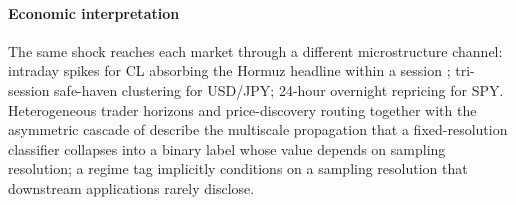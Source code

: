 \documentclass[preprint,12pt,authoryear]{elsarticle}
\begin{document}
\paragraph{Economic interpretation}
The same shock reaches each market through a different microstructure channel: intraday spikes for CL absorbing the Hormuz headline within a session \citep{ReutersIranMarkets2026Feb28}; tri-session safe-haven clustering for USD/JPY; 24-hour overnight repricing for SPY. Heterogeneous trader horizons \citep{MullerDacorognaDave1997HARCH} and price-discovery routing \citep{HasbrouckOneSecurity1995} together with the asymmetric cascade of \citet{GradojevicTsiakas2021} describe the multiscale propagation that a fixed-resolution classifier collapses into a binary label whose value depends on sampling resolution; a regime tag implicitly conditions on a sampling resolution that downstream applications rarely disclose.
\end{document}
